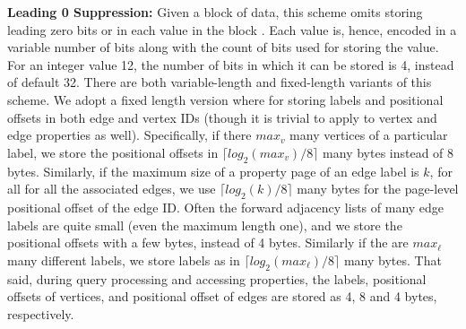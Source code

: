 \noindent  \textbf{Leading 0 Suppression:} Given a block of data, this scheme omits storing leading zero bits or in each value in the block \cite{beckmann:sparse}. Each value is, hence, encoded in a variable number of bits along with the count of bits used for storing the value. For an integer value 12, the number of bits in which it can be stored is 4, instead of default 32. There are both variable-length and fixed-length variants of this scheme. We adopt a fixed length version where for storing labels and positional offsets in both edge and vertex IDs (though it is trivial to apply to vertex and edge properties as well). Specifically, if there $max_v$ many vertices of a particular label, we store the positional offsets in $\lceil log_2(max_v)/8\rceil$ many bytes instead of 8 bytes. Similarly, if the maximum size of a property page of an edge label is $k$, for all for all the associated edges, we use $\lceil log_2(k)/8\rceil$ many bytes for the page-level positional offset of the edge ID. Often the forward adjacency lists of many edge labels are quite small (even the maximum length one), and we store the positional offsets with a few bytes, instead of 4 bytes. Similarly if the are $max_{\ell}$ many different labels, we store labels as in $\lceil log_2(max_{\ell})/8\rceil$ many bytes. That said, during query processing and accessing properties, the  labels, positional offsets of vertices, and positional offset of edges are stored as 4, 8 and 4 bytes, respectively.


	
